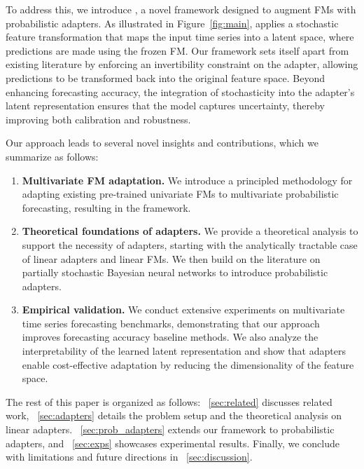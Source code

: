 To address this, we introduce \adapts, a novel framework designed to augment FMs with probabilistic adapters. As illustrated in Figure~\ref{fig:main}, \adapts applies a stochastic feature transformation that maps the input time series into a latent space, where predictions are made using the frozen FM. Our framework sets itself apart from existing literature by enforcing an invertibility constraint on the adapter, allowing predictions to be transformed back into the original feature space. Beyond enhancing forecasting accuracy, the integration of stochasticity into the adapter's latent representation ensures that the model captures uncertainty, thereby improving both calibration and robustness.

Our approach leads to several novel insights and contributions, which we summarize as follows:  

\begin{enumerate}
    \item \textbf{Multivariate FM adaptation.} We introduce a principled methodology for adapting existing pre-trained univariate FMs to multivariate probabilistic forecasting, resulting in the \adapts framework. 
    \item \textbf{Theoretical foundations of adapters.} We provide a theoretical analysis to support the necessity of adapters, starting with the analytically tractable case of linear adapters and linear FMs. We then build on the literature on partially stochastic Bayesian neural networks to introduce probabilistic adapters.  
    \item \textbf{Empirical validation.} We conduct extensive experiments on multivariate time series forecasting benchmarks, demonstrating that our approach improves forecasting accuracy baseline methods. We also analyze the interpretability of the learned latent representation and show that adapters enable cost-effective adaptation by reducing the dimensionality of the feature space. 
\end{enumerate}

The rest of this paper is organized as follows: ~\cref{sec:related} discusses related work, ~\cref{sec:adapters} details the problem setup and the theoretical analysis on linear adapters. ~\cref{sec:prob_adapters} extends our framework to probabilistic adapters, and ~\cref{sec:exps} showcases experimental results. Finally, we conclude with limitations and future directions in ~\cref{sec:discussion}.